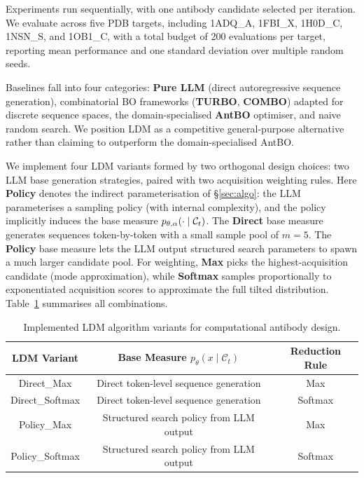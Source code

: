 Experiments run sequentially, with one antibody candidate selected per iteration. We evaluate across five PDB targets, including 1ADQ\_A, 1FBI\_X, 1H0D\_C, 1NSN\_S, and 1OB1\_C, with a total budget of 200 evaluations per target, reporting mean performance and one standard deviation over multiple random seeds.

Baselines fall into four categories: \textbf{Pure LLM} (direct autoregressive sequence generation), combinatorial BO frameworks (\textbf{TURBO}, \textbf{COMBO}) adapted for discrete sequence spaces, the domain-specialised \textbf{AntBO} optimiser, and naive random search. We position LDM as a competitive general-purpose alternative rather than claiming to outperform the domain-specialised AntBO.

We implement four LDM variants formed by two orthogonal design choices: two LLM base generation strategies, paired with two acquisition weighting rules. Here \textbf{Policy} denotes the indirect parameterisation of \S\ref{sec:algo}: the LLM parameterises a sampling policy (with internal complexity), and the policy implicitly induces the base measure $p_{\theta,\alpha}(\cdot\mid\mathcal{C}_t)$. The \textbf{Direct} base measure generates sequences token-by-token with a small sample pool of \(m=5\). The \textbf{Policy} base measure lets the LLM output structured search parameters to spawn a much larger candidate pool. For weighting, \textbf{Max} picks the highest-acquisition candidate (mode approximation), while \textbf{Softmax} samples proportionally to exponentiated acquisition scores to approximate the full tilted distribution. Table~\ref{tab:ldm-variants-antibody} summarises all combinations.

\begin{table}[htbp]
    \centering
    \begin{tabular}{ccc}
        \hline
        LDM Variant & Base Measure \(p_\theta(x \mid \mathcal{C}_t)\) & Reduction Rule \\
        \hline
        Direct\_Max & Direct token-level sequence generation & Max \\
        Direct\_Softmax & Direct token-level sequence generation & Softmax \\
        Policy\_Max & Structured search policy from LLM output & Max \\
        Policy\_Softmax & Structured search policy from LLM output & Softmax \\
        \hline
    \end{tabular}
    \caption{Implemented LDM algorithm variants for computational antibody design.}
    \label{tab:ldm-variants-antibody}
\end{table}


